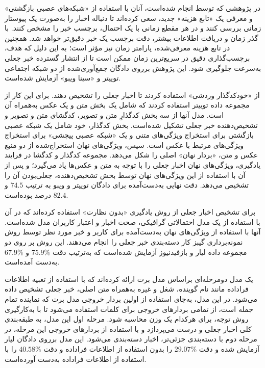 در پژوهشی که توسط \citet{ramezani2019news} انجام شده‌است، آنان با استفاده از «شبکه‌های عصبی بازگشتی» و معرفی یک «تابع هزینه» جدید، سعی کرده‌اند تا دنباله اخبار را به‌صورت یک پیوستار زمانی بررسی کنند و در هر مقطع زمانی با یک احتمال، برچسب خبر را مشخص کنند. با گذر زمان و دریافت اطلاعات بیشتر، دقت برچسب یک خبر دقیق‌تر خواهد شد. همچنین در تابع هزینه معرفی‌شده، پارامتر زمان نیز مؤثر است؛ به این دلیل که هدف، برچسب‌گذاری دقیق در سریع‌ترین زمان ممکن است تا از انتشار گسترده خبر جعلی به‌سرعت جلوگیری شود. این پژوهش برروی دادگان جمع‌آوری‌شده از دو شبکه اجتماعی توییتر و «سینا ویبو» آزمایش شده‌است.

\citet{khattar2019mvae}   از  «خودکدگذار وردشی» استفاده کردند تا اخبار جعلی را تشخیص دهند. برای این کار از مجموعه داده توییتر استفاده کردند که شامل یک بخش متن و یک عکس به‌همراه آن است. مدل آنها از سه بخش کدگذارِ متن و تصویر، کدگشای متن و تصویر و تشخیص‌دهنده خبر جعلی تشکیل شده‌است. بخش کدگذار، خود شامل یک شبکه عصبی بازگشتی برای استخراج ویژگی‌های متنی و یک «شبکه عصبی پیچشی» برای استخراج ویژگی‌های مرتبط با عکس است. سپس، ویژگی‌های نهان استخراج‌شده از دو منبع عکس و متن، «بردار نهان» اصلی را شکل می‌دهد. مجموعه کدگذار و کدگشا در فرایند یادگیری، ویژگی‌های نهان اخبار جعلی را با توجه به متن و عکس‌ها یاد می‌گیرد؛ و پس از آن با استفاده از این ویژگی‌های نهان توسط بخش تشخیص‌دهنده، جعلی‌بودن آن را تشخیص می‌دهد. دقت نهایی به‌دست‌آمده برای دادگان توییتر و ویبو به ترتیب $74.5$ و $82.4$ درصد بوده‌است. 

\citet{yang2019unsupervised} برای تشخیص اخبار جعلی از روش یادگیری «بدون نظارت» استفاده کرده‌اند که در آن با استفاده از  یک مدل احتمالاتی گرافیکی، صحت اخبار و اعتبار کاربران مدل شده‌است. آنها با استفاده از ویژگی‌های نهان به‌دست‌آمده برای  کاربر و خبر مورد نظر توسط روش نمونه‌برداری گیبز کار دسته‌بندی خبر جعلی را انجام می‌دهند. این روش بر روی دو مجموعه داده لیار  \citep{wang2017liar}  و بازفیدنیوز آزمایش شده‌است که به‌ترتیب دقت \%$75.9$ و \%$67.9$ به‌دست آمده‌است.

\citet{liu2019two} یک مدل دومرحله‌ای براساس مدل برت ارائه کرده‌اند که با استفاده از تعبیه اطلاعات فراداده مانند نام
 گوینده، شغل و غیره به‌همراه متن اصلی، خبر جعلی تشخیص داده می‌شود. در این مدل، به‌جای استفاده از اولین بردار خروجی مدل برت که نماینده تمام جمله است، از تمامی بردارهای خروجی برای کلمات استفاده می‌شود تا با به‌کارگیری روش توجه، برای
 هرکدام یک وزن محاسبه شود. مرحله اول این مدل، به طبقه‌بندی کلی اخبار جعلی و درست می‌پردازد و با استفاده از بردارهای خروجی این مرحله، در مرحله دوم با دسته‌بندی جزئی‌تر، اخبار دسته‌بندی می‌شود. این مدل برروی دادگان لیار آزمایش شده و دقت \%$29.07$ را بدون استفاده از اطلاعات فراداده و دقت \%$40.58$ را با استفاده از اطلاعات فراداده به‌دست آورده‌است.

